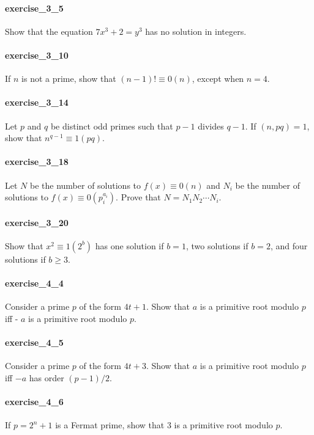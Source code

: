 \documentclass{article}
\begin{document}
\paragraph{exercise\_3\_5} Show that the equation $7 x^{3}+2=y^{3}$ has no solution in integers.

\paragraph{exercise\_3\_10} If $n$ is not a prime, show that $(n-1) ! \equiv 0(n)$, except when $n=4$.

\paragraph{exercise\_3\_14} Let $p$ and $q$ be distinct odd primes such that $p-1$ divides $q-1$. If $(n, p q)=1$, show that $n^{q-1} \equiv 1(p q)$.

\paragraph{exercise\_3\_18} Let $N$ be the number of solutions to $f(x) \equiv 0(n)$ and $N_{i}$ be the number of solutions to $f(x) \equiv 0\left(p_{i}^{a_{i}}\right)$. Prove that $N=N_{1} N_{2} \cdots N_{i}$.

\paragraph{exercise\_3\_20} Show that $x^{2} \equiv 1\left(2^{b}\right)$ has one solution if $b=1$, two solutions if $b=2$, and four solutions if $b \geq 3$.

\paragraph{exercise\_4\_4} Consider a prime $p$ of the form $4 t+1$. Show that $a$ is a primitive root modulo $p$ iff - $a$ is a primitive root modulo $p$.

\paragraph{exercise\_4\_5} Consider a prime $p$ of the form $4 t+3$. Show that $a$ is a primitive root modulo $p$ iff $-a$ has order $(p-1) / 2$.

\paragraph{exercise\_4\_6} If $p=2^{n}+1$ is a Fermat prime, show that 3 is a primitive root modulo $p$.
\end{document}
